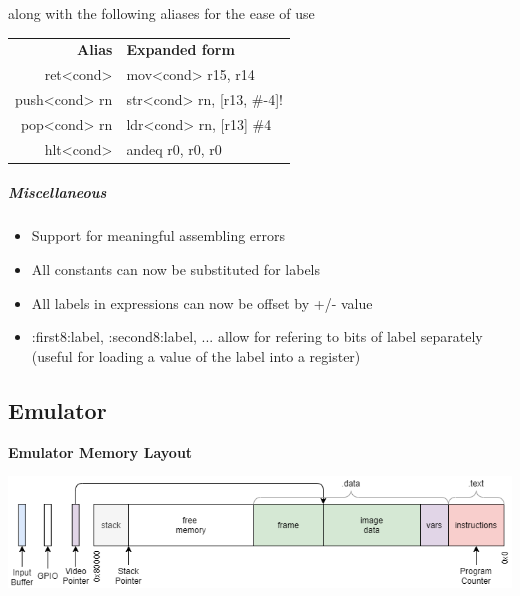 \documentclass[11pt]{article}
\begin{document}
along with the following aliases for the ease of use
\begin{center}
	\begin{tabular}{r|l}
		\textbf{Alias} & \textbf{Expanded form} \\
		ret<cond> & mov<cond> r15, r14\\
		push<cond> rn & str<cond> rn, [r13, \#-4]!\\
		pop<cond> rn & ldr<cond> rn, [r13] \#4\\
		hlt<cond> & andeq r0, r0, r0
	\end{tabular}
\end{center}
\subparagraph*{Miscellaneous}
\begin{itemize}
\item Support for meaningful assembling errors
\item All constants can now be substituted for labels
\item All labels in expressions can now be offset by +/- value
\item :first8:label, :second8:label, ... allow for refering to bits of label separately (useful for loading a value of the label into a register)
\end{itemize}
\subsection*{Emulator}
\centerline{\textbf{Emulator Memory Layout}}
\includegraphics[width=\textwidth]{emulator memory}
\end{document}
